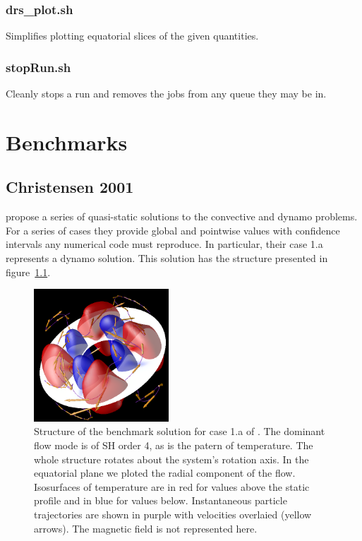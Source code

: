 \documentclass[a4paper,10pt]{book}
\begin{document}
\subsection{drs\_plot.sh}
Simplifies plotting equatorial slices of the given quantities.
\subsection{stopRun.sh}
Cleanly stops a run and removes the jobs from any queue they may be in.


\chapter{Benchmarks}
\section{Christensen 2001}
\label{bench:Christ01}
\citet{ChristensenEtAl01} propose a series of quasi-static solutions to the
convective and dynamo problems. For a series of cases they provide global and
pointwise values with confidence intervals any numerical code must reproduce.
In particular, their case 1.a represents a dynamo solution. This solution has
the structure presented in figure~\ref{f:BenchChrist01}.
\begin{figure}[htb]
\centering
 \includegraphics[width=0.45\textwidth]{figs/BenchmarkStructure}
 \caption{Structure of the benchmark solution for case 1.a of
\citep{ChristensenEtAl01}. The dominant flow mode is of SH order 4, as is the
patern of temperature. The whole structure rotates about the system's rotation
axis. In the equatorial plane we ploted the radial component of the flow.
Isosurfaces of temperature are in red for values above the static profile and
in blue for values below. Instantaneous particle trajectories are shown in
purple with velocities overlaied (yellow arrows). The magnetic field is not
represented here.}
 \label{f:BenchChrist01}
\end{figure}
\end{document}
